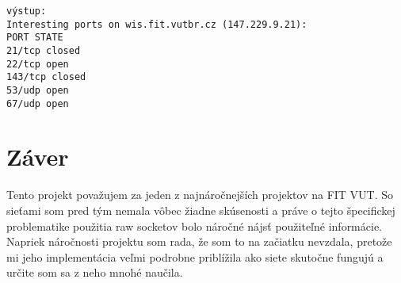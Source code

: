 \documentclass[11pt, a4paper]{article}
\begin{document}
\texttt{výstup:}\\
\texttt{Interesting ports on wis.fit.vutbr.cz (147.229.9.21):}\\
\texttt{PORT	STATE}\\
\texttt{21/tcp	closed}\\
\texttt{22/tcp	open}\\
\texttt{143/tcp	closed}\\
\texttt{53/udp	open}\\
\texttt{67/udp	open}


\section{Záver}
Tento projekt považujem za jeden z najnáročnejších projektov na FIT VUT. So sieťami som pred tým nemala vôbec žiadne skúsenosti a práve o tejto špecifickej problematike použitia raw socketov bolo náročné nájsť použiteľné informácie. Napriek náročnosti projektu som rada, že som to na začiatku nevzdala, pretože mi jeho implementácia veľmi podrobne priblížila ako siete skutočne fungujú a určite som sa z neho mnohé naučila.

\newpage

\renewcommand{\refname}{Použité zdroje}

\end{document}
